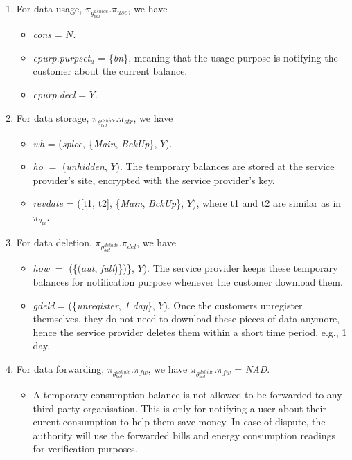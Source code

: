 \documentclass[a4paper]{article}
\begin{document}
\begin{enumerate}
\item For data usage, $\pi_{\theta^{dshide}_{bal}}$.$\pi_{use}$, we have 
\begin{itemize}
\item \textit{cons} = $N$. 
\item  \textit{cpurp}.\textit{purpset}$_u$ = \{\textit{bn}\}, meaning that the usage purpose is notifying the customer about the current balance. 
\item \textit{cpurp}.\textit{decl} = $Y$.  
\end{itemize}

\item For data storage, $\pi_{\theta^{dshide}_{bal}}$.$\pi_{str}$, we have 
\begin{itemize} 
\item \textit{wh} = (\textit{sploc}, \{\textit{Main}, \textit{BckUp}\}, $Y$).     

\item \textit{ho} $=$ (\textit{unhidden}, $Y$). The temporary balances are stored at the service provider's site, encrypted with the service provider's key. 

\item \textit{revdate} = ([t1, t2],  \{\textit{Main}, \textit{BckUp}\}, $Y$), where t1 and t2 are similar as in $\pi_{\theta_{pi}}$.   
\end{itemize}   

\item For data deletion, $\pi_{\theta^{dshide}_{bal}}$.$\pi_{del}$, we have 
\begin{itemize} 
\item \textit{how} $=$ (\{(\textit{aut}, \textit{full})\})\}, $Y$). The service provider keeps these temporary  balances for notification purpose whenever the customer download them. 

\item \textit{gdeld} = (\{\textit{unregister}, \textit{1 day}\}, $Y$).  Once the customers unregister themselves, they do not need to download these pieces of data anymore, hence the service provider deletes them within a short time period, e.g., 1 day.  
\end{itemize}   

\item For data forwarding, $\pi_{\theta^{dshide}_{bal}}$.$\pi_{fw}$, we have  $\pi_{\theta^{dshide}_{bal}}$.$\pi_{fw}$ = \textit{NAD}. 

\begin{itemize}
\item A temporary consumption balance is not allowed to be forwarded to any third-party organisation. This is only for notifying a user about their curent consumption to help them save money. In case of dispute, the authority will use the forwarded bills and energy consumption readings for verification purposes.    
\end{itemize}   

 
\end{enumerate} 
    
\end{document}

